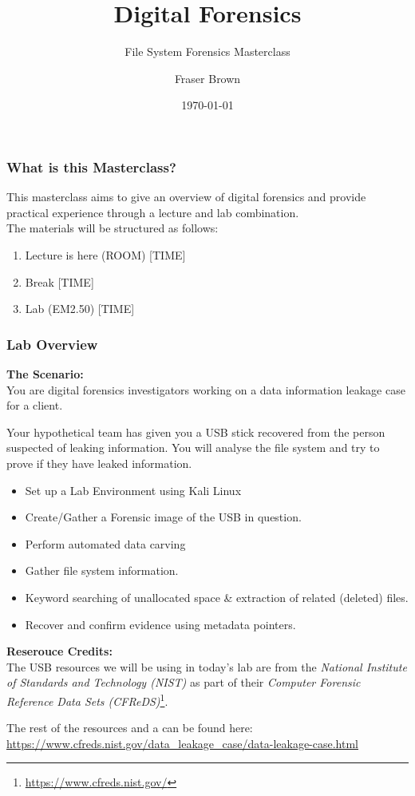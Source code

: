 \documentclass{beamer}
\title{Digital Forensics}
\subtitle{File System Forensics Masterclass}
\author{Fraser Brown}
\institute{Heriot-Watt University}
\date{\today}
\begin{document}
\begin{frame}
\titlepage
\end{frame}

\begin{frame}
\frametitle{What is this Masterclass?}
This masterclass aims to give an overview of digital forensics and provide practical experience through a lecture and lab combination.\\
\vspace{\baselineskip}
The materials will be structured as follows:
\begin{enumerate}
	\item Lecture is here (ROOM) [TIME]
	\item Break [TIME]
	\item Lab (EM2.50) [TIME]
\end{enumerate}
\end{frame}

\begin{frame}[allowframebreaks]
\frametitle{Lab Overview}
\textbf{The Scenario:}\\
You are digital forensics investigators working on a data information leakage case for a client.\\
\vspace{\baselineskip}

Your hypothetical team has given you a USB stick recovered from the person suspected of leaking information. You will analyse the file system and try to prove if they have leaked information.\\


\begin{itemize}
	\item Set up a Lab Environment using Kali Linux
	\item Create/Gather a Forensic image of the USB in question.
	\item Perform automated data carving
	\item Gather file system information.
	\item Keyword searching of unallocated space {\&} extraction of related (deleted) files.
	\item Recover and confirm evidence using metadata pointers.
\end{itemize}

\textbf{Reserouce Credits:}\\
The USB resources we will be using in today's lab are from the \textit{National Institute of Standards and Technology (NIST)} as part of their \textit{Computer Forensic Reference Data Sets (CFReDS)}\footnote{\url{https://www.cfreds.nist.gov/}}.\\
\vspace{\baselineskip}

The rest of the resources and a can be found here:\\
\url{https://www.cfreds.nist.gov/data_leakage_case/data-leakage-case.html}
\end{frame}
\end{document}
